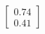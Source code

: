 \documentclass[preview]{standalone}
\begin{document}
\begin{align*}
\begin{bmatrix} 0.74 \\ 0.41 \end{bmatrix}
\end{align*}
\end{document}
